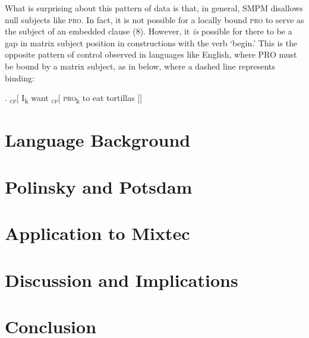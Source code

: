 \documentclass[12pt]{article}
\begin{document}
What is surprising about this pattern of data is that, in general, SMPM disallows null subjects like \textsc{pro}. In fact, it is not possible for a locally bound \textsc{pro} to serve as the subject of an embedded clause (8). However, it \emph{is} possible for there to be a gap in matrix subject position in constructions with the verb `begin.' This is the opposite pattern of control observed in languages like English, where \textsc{PRO} must be bound by a matrix subject, as in \Next below, where a dashed line represents binding:

\ex. \textsubscript{\textsc{cp}}[ I\textsubscript{k} want \textsubscript{\textsc{cp}}[ \textsc{pro}\textsubscript{k} to eat tortillas ]]

\section{Language Background}

\section{Polinsky and Potsdam}

\section{Application to Mixtec}

\section{Discussion and Implications}

\section{Conclusion}


\nocite{polinskandpotsdam2002}
\nocite{ostrove2018}
\footnotesize{}	
\end{document}
